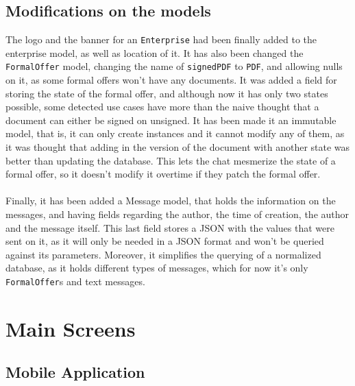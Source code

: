 \documentclass[./main.tex]{subfiles}
\begin{document}
\subsection{Modifications on the models}
The logo and the banner for an \texttt{Enterprise} had been finally added to the enterprise model, as well as  location of it. It has also been changed the \texttt{FormalOffer} model, changing the name of \texttt{signedPDF} to \texttt{PDF}, and allowing nulls on it, as some formal offers won't have any documents. It was added a field for storing the state of the formal offer, and although now it has only two states possible, some detected use cases have more than the naive thought that a document can either be signed on unsigned. It has been made it an immutable model, that is, it can only create instances and it cannot modify any of them, as it was thought that adding in the version of the document with another state was better than updating the database. This lets the chat mesmerize the state of a formal offer, so it doesn't modify it overtime if they patch the formal offer.\\
\\
Finally, it has been added a Message model, that holds the information on the messages, and having fields regarding the author, the time of creation, the author and the message itself. This last field stores a JSON with the values that were sent on it, as it will only be needed in a JSON format and won't be queried against its parameters. Moreover, it simplifies the querying of a normalized database, as it holds different types of messages, which for now it's only \texttt{FormalOffer}s and text messages.
\section{Main Screens} \label{sec:views}
\subsection{Mobile Application}
\end{document}
